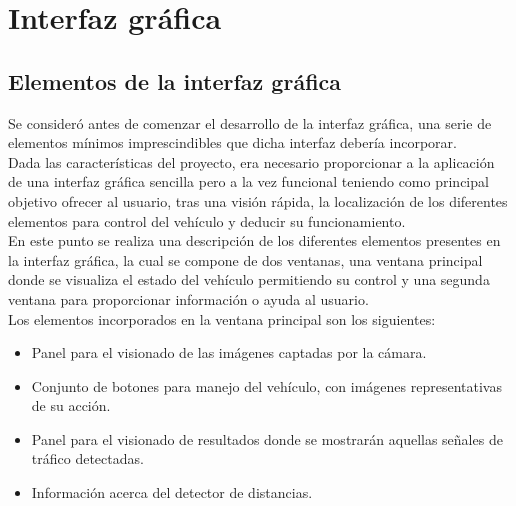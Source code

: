

\chapter{Interfaz gráfica}
\label{chap:interfaz-gráfica}

\section {Elementos de la interfaz gráfica}

Se consideró antes de comenzar el desarrollo de la interfaz gráfica, una serie de elementos mínimos imprescindibles que dicha interfaz debería incorporar.\\

Dada las características del proyecto, era necesario proporcionar a la aplicación de una interfaz gráfica sencilla pero a la vez funcional teniendo como principal objetivo ofrecer al usuario, tras una visión rápida, la localización de los diferentes elementos para control del vehículo y deducir su funcionamiento.\\

En este punto se realiza una descripción de los diferentes elementos presentes en la interfaz gráfica, la cual se compone de dos ventanas, una ventana principal donde se visualiza el estado del vehículo permitiendo su control y una segunda ventana para proporcionar información o ayuda al usuario.\\

Los elementos incorporados en la ventana principal son los siguientes:

\begin{itemize}

\item Panel para el visionado de las imágenes captadas por la cámara.

\item Conjunto de botones para manejo del vehículo, con imágenes representativas de su acción.

\item Panel para el visionado de resultados donde se mostrarán aquellas señales de tráfico detectadas.

\item Información acerca del detector de distancias.

\end{itemize}

